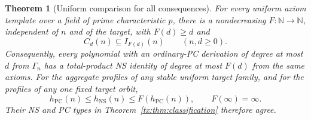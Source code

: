 \documentclass[11pt,a4paper,oneside,openany]{book}
\newtheorem{theorem}{Theorem}[chapter]
\theoremstyle{definition}\newtheorem{definition}[theorem]{Definition}
\theoremstyle{remark}\newtheorem{remark}[theorem]{Remark}
\newcommand{\NS}{\mathrm{NS}}\newcommand{\PC}{\mathrm{PC}}
\newcommand{\NN}{\mathbb N}\newcommand{\N}{\mathbb N}\newcommand{\Z}{\mathbb Z}\newcommand{\Q}{\mathbb Q}\newcommand{\Fp}{\mathbb F_p}
\numberwithin{equation}{chapter}
\begin{document}
\begin{theorem}[Uniform comparison for all consequences]\label{tx:thm:comparison}
For every uniform axiom template over a field of prime characteristic
$p$, there is a nondecreasing $F:\NN\to\NN$, independent of $n$ and of
the target, with $F(d)\ge d$ and
\begin{equation}\label{tx:eq:whole-comparison}
                              C_d(n)\subseteq I_{F(d)}(n)
                       \qquad(n,d\ge0).
\end{equation}
Consequently, every polynomial with an ordinary-PC derivation of degree
at most $d$ from $\Gamma_n$ has a total-product NS identity of degree at
most $F(d)$ from the same axioms. For the aggregate profiles of any
stable uniform target family, and for the profiles of any one fixed
target orbit,
\begin{equation}\label{tx:eq:target-comparison}
                      h_{\PC}(n)\le h_{\NS}(n)\le F(h_{\PC}(n)),
                      \qquad F(\infty)=\infty.
\end{equation}
Their NS and PC types in Theorem~\ref{tx:thm:classification} therefore agree.
\end{theorem}
\end{document}

